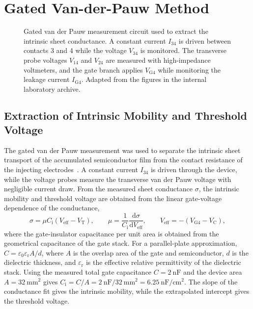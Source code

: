 
\section{Gated Van-der-Pauw Method}

\begin{figure}[htbp]
\centering
\resizebox{0.8\textwidth}{!}{}
\caption[Gated van der Pauw measurement circuit]{Gated van der Pauw measurement circuit used to extract the intrinsic sheet conductance. A constant current $I_\text{34}$ is driven between contacts 3 and 4 while the voltage $V_\text{34}$ is monitored. The transverse probe voltages $V_\text{14}$ and $V_\text{24}$ are measured with high-impedance voltmeters, and the gate branch applies $V_\text{G4}$ while monitoring the leakage current $I_\text{G4}$. Adapted from the figures in the internal laboratory archive.}
\label{fig:gated_vdp_circuit}
\end{figure}




\subsection{Extraction of Intrinsic Mobility and Threshold Voltage}

The gated van der Pauw measurement was used to separate the intrinsic sheet transport of the accumulated semiconductor film from the contact resistance of the injecting electrodes~\cite{Rolin2017GVDP,Lee2024GVDPIGZO}. A constant current $I_{34}$ is driven through the device, while the voltage probes measure the transverse van der Pauw voltage with negligible current draw. From the measured sheet conductance $\sigma$, the intrinsic mobility and threshold voltage are obtained from the linear gate-voltage dependence of the conductance,
\begin{equation}
\sigma = \mu C_\mathrm{i}\left(V_\mathrm{eff}-V_\mathrm{T}\right),
\qquad
\mu=\frac{1}{C_\mathrm{i}}\frac{\mathrm{d}\sigma}{\mathrm{d}V_\mathrm{eff}},
\qquad
V_\mathrm{eff}=-(V_\text{G4}-V_\text{C}),
\end{equation}
where the gate-insulator capacitance per unit area is obtained from the
geometrical capacitance of the gate stack. For a parallel-plate approximation,
$C=\varepsilon_0\varepsilon_\mathrm{r}A/d$, where $A$ is the overlap area of
the gate and semiconductor, $d$ is the dielectric thickness, and
$\varepsilon_\mathrm{r}$ is the effective relative permittivity of the dielectric
stack. Using the measured total gate capacitance $C=\SI{2}{\nano\farad}$ and
the device area $A=\SI{32}{\milli\metre\squared}$ gives
$C_\mathrm{i}=C/A=\SI{2}{\nano\farad}/\SI{32}{\milli\metre\squared}
=\SI{6.25}{\nano\farad\per\centi\metre\squared}$. The slope of the
conductance fit gives the intrinsic mobility, while the extrapolated intercept
gives the threshold voltage. 

